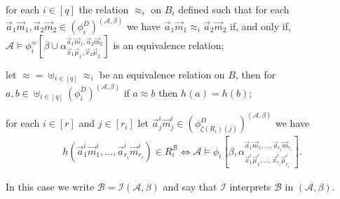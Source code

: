 \documentclass[../main/thesis.tex]{subfiles}
\begin{document}
\begin{definition}
  \begin{myenum}
  \item for each $i \in [q]$ the relation $\approx_i$ on $B_i$ defined such that
    for each $\vec{a}_1\vec{m}_1, \vec{a}_2\vec{m}_2 \in
    (\phi^D_i)^{(\mathcal{A}, \beta)}$ we have $\vec{a}_1\vec{m}_1 \approx_i
    \vec{a}_2\vec{m}_2$ if, and only if, $\mathcal{A} \models
    \phi^{\approx}_i[\beta \cup \alpha^{\vec{a}_1\vec{m}_1,
      \vec{a}_2\vec{m}_2}_{\vec{x}_1 \vec{\mu}_1, \vec{x}_2 \vec{\mu}_2}]$ is an
    equivalence relation;
  \item let $\approx = \uplus_{i \in [q]}\approx_i$ be an equivalence relation
    on $B$, then for $a , b \in \uplus_{i \in [q]}(\phi^D_i)^{(\mathcal{A},
      \beta)}$ if $a \approx b$ then $h(a) = h(b)$;
  \item for each $i \in [r]$ and $j \in [r_i]$ let $\vec{a}^i_j\vec{m}^i_j \in
    (\phi^D_{\zeta(R_i)(j)})^{(\mathcal{A}, \beta)}$ we have
    \begin{align*}
      h(\vec{a}^i_1 \vec{m}^i_1 , \ldots , \vec{a}^i_{r_i}\vec{m}^i_{r_i})
      \in R^{\mathcal{B}}_i \iff \mathcal{A} \models \phi_i
      [\beta, \alpha^{\vec{a}_1\vec{m}_1, \ldots, \vec{a}_{r_i} \vec{m}_{r_i}}_{\vec{x}^i_1 \vec{\mu}^i_1 , \ldots, \vec{x}^i_{r_i} \vec{\mu}^i_{r_i}}].
    \end{align*}
  \end{myenum}

  In this case we write $\mathcal{B} = \mathcal{I} (\mathcal{A}, \beta)$ and say
  that $\mathcal{I}$ interprets $\mathcal{B}$ in $(\mathcal{A}, \beta)$.
\end{definition}






\end{document}
